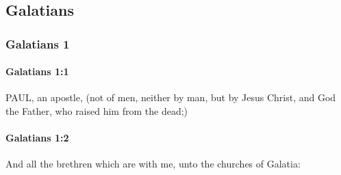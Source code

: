 \subsection{Galatians}
	\label{GALATIANS}
	
	\subsubsection{Galatians 1} %
		\label{GALATIANS-1}
		
		\paragraph{Galatians 1:1} %
			\label{GALATIANS-1-1}

			PAUL, an apostle, (not of men, neither by man, but by Jesus Christ, and God the Father, who raised him from the dead;)

			\begin{framed}
			\scriptsize
				\begin{compactdesc}
					\item[SBLG] 
				\end{compactdesc}
			\end{framed}

		\paragraph{Galatians 1:2} %
			\label{GALATIANS-1-2}

			And all the brethren which are with me, unto the churches of Galatia:


